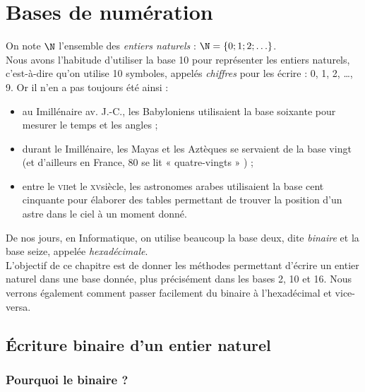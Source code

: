 \chapter{Bases de numération}


On note $\N$ l'ensemble des \textit{entiers naturels} : $\N=\lbrace 0;1;2;\ldots\rbrace$.\\

Nous avons l'habitude d'utiliser la base 10 pour représenter les entiers naturels, c'est-à-dire qu'on utilise 10 symboles, appelés \textit{chiffres}
pour les écrire : 0, 1, 2, \ldots, 9.
Or il n'en a pas toujours été ainsi :
\begin{itemize}
    \item 	au \textsc{I}\er millénaire av. J.-C., les Babyloniens utilisaient la base soixante pour mesurer le temps et les angles ;
    \item 	durant le \textsc{I}\er millénaire, les Mayas et les Aztèques se servaient de la base vingt (et d'ailleurs en France, 80 se lit «
          quatre-vingts » ) ;
    \item 	entre le \textsc{vii}\eme et le \textsc{xv}\eme siècle, les astronomes arabes utilisaient la base cent cinquante pour élaborer des tables
          permettant de trouver la position d'un astre dans le ciel à un moment donné.
\end{itemize}
De nos jours, en Informatique, on utilise beaucoup la base deux, dite \textit{binaire} et la base seize, appelée \textit{hexadécimale}.\\
L'objectif de ce chapitre est de donner les méthodes permettant d'écrire un entier naturel dans une base donnée, plus précisément dans les bases 2,
10 et 16. Nous verrons également comment passer facilement du binaire à l'hexadécimal et vice-versa.

\section{\'Ecriture binaire d'un entier naturel}
\subsection{Pourquoi le binaire ?}


